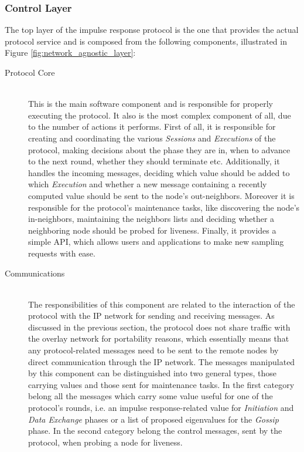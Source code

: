 \documentclass[a4paper,11pt,twoside]{report}
\begin{document}
\subsubsection*{Control Layer}

The top layer of the impulse response protocol is the one that provides the actual protocol service and is composed from the following components, illustrated in Figure \ref{fig:network_agnostic_layer}:

\begin{description}
\item[Protocol Core] \hfill \\
 This is the main software component and is responsible for properly executing the protocol. It also is the most complex component of all, due to the number of actions it performs. First of all, it is responsible for creating and coordinating the various \textit{Sessions} and \textit{Executions} of the protocol, making decisions about the phase they are in, when to advance to the next round, whether they should terminate etc. Additionally, it handles the incoming messages, deciding which value should be added to which \textit{Execution} and whether a new message containing a recently computed value should be sent to the node's out-neighbors. Moreover it is responsible for the protocol's maintenance tasks, like discovering the node's in-neighbors, maintaining the neighbors lists and deciding whether a neighboring node should be probed for liveness. Finally, it provides a simple API, which allows users and applications to make new sampling requests with ease. 
\item[Communications] \hfill \\
The responsibilities of this component are related to the interaction of the protocol with the IP network for sending and receiving messages. As discussed in the previous section, the protocol does not share traffic with the overlay network for portability reasons, which essentially means that any protocol-related messages need to be sent to the remote nodes by direct communication through the IP network. The messages manipulated by this component can be distinguished into two general types, those carrying values and those sent for maintenance tasks. In the first category belong all the messages which carry some value useful for one of the protocol's rounds, i.e. an impulse response-related value for \textit{Initiation} and \textit{Data Exchange} phases or a list of  proposed eigenvalues for the \textit{Gossip} phase. In the second category belong the control messages, sent by the protocol, when probing a node for liveness.\\

\end{description}
\end{document}
